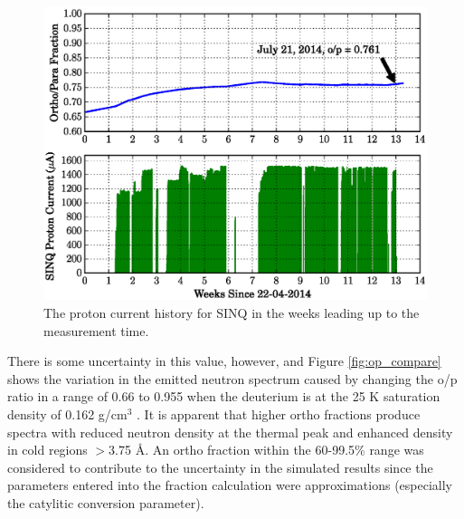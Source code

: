 \documentclass[5p,12pt]{elsarticle}
\begin{document}
\begin{figure}[h!] 
  \centering
    \includegraphics[width=\columnwidth]{graphics/p_current.eps}
     \caption{The proton current history for SINQ in the weeks leading up to the measurement time. \label{fig:p_current}}
\end{figure}

There is some uncertainty in this value, however, and Figure \ref{fig:op_compare} shows the variation in the emitted neutron spectrum caused by changing the o/p ratio in a range of 0.66 to 0.955 when the deuterium is at the 25 K saturation density of 0.162 g/cm$^3$ \cite{bnl_cryo}.  It is apparent that higher ortho fractions produce spectra with reduced neutron density at the thermal peak and enhanced density in cold regions $>$3.75 {\AA}.  An ortho fraction within the 60-99.5\% range was considered to contribute to the uncertainty in the simulated results since the parameters entered into the fraction calculation were approximations (especially the catylitic conversion parameter).
\end{document}
